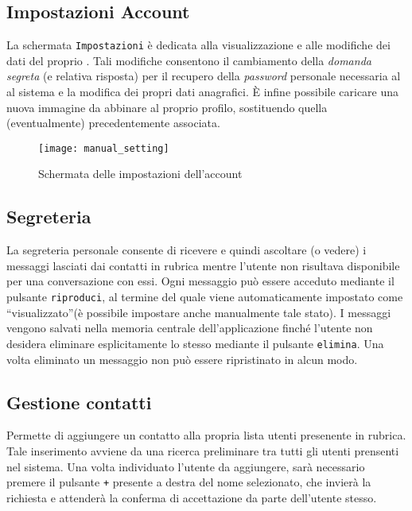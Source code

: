 \subsection{Impostazioni Account}
La schermata \texttt{Impostazioni} è dedicata alla visualizzazione e alle modifiche dei dati del proprio . Tali modifiche consentono il cambiamento della \textit{domanda segreta} (e relativa risposta) per il recupero della \textit{password} personale necessaria al \underline{} al sistema e la modifica dei propri dati anagrafici.
È infine possibile caricare una nuova immagine da abbinare al proprio profilo, sostituendo quella (eventualmente) precedentemente associata.


\begin{figure}[H]
  \texttt{[image: manual\_setting]}
\caption{Schermata delle impostazioni dell'account}\label{fig:setting}
\end{figure}

 
\subsection{Segreteria}
La segreteria personale consente di ricevere e quindi ascoltare (o vedere) i messaggi lasciati dai contatti in rubrica mentre l'utente non risultava disponibile per una conversazione con essi.
Ogni messaggio può essere acceduto mediante il pulsante \texttt{riproduci}, al termine del quale viene automaticamente impostato come ``visualizzato''(è possibile impostare anche manualmente tale stato).
I messaggi vengono salvati nella memoria centrale dell'applicazione \caName{} finché l'utente non desidera eliminare esplicitamente lo stesso mediante il pulsante \texttt{elimina}. Una volta eliminato un messaggio non può essere ripristinato in alcun modo.



\subsection{Gestione contatti}
Permette di aggiungere un contatto alla propria lista utenti presenente in rubrica. Tale inserimento avviene da una ricerca preliminare tra tutti gli utenti prensenti nel sistema. Una volta individuato l'utente da aggiungere, sarà necessario premere il pulsante \texttt{+} presente a destra del nome selezionato, che invierà la richiesta e attenderà la conferma di accettazione da parte dell'utente stesso.


